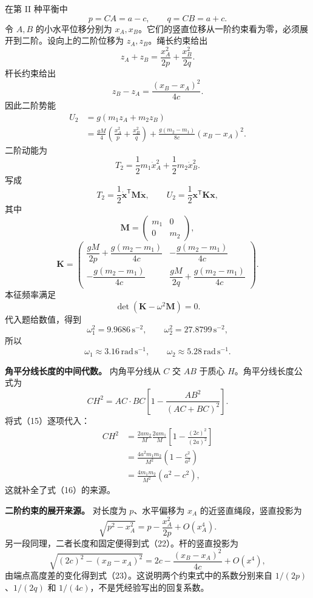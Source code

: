 \documentclass[12pt,a4paper,UTF8]{ctexart}
\begin{document}
在第 II 种平衡中 \[
p=CA=a-c,
\qquad
q=CB=a+c. \tag{21}
\] 令 \(A,B\) 的小水平位移分别为
\(x_A,x_B\)。它们的竖直位移从一阶约束看为零，必须展开到二阶。设向上的二阶位移为
\(z_A,z_B\)。绳长约束给出 \[
z_A+z_B=\frac{x_A^2}{2p}+\frac{x_B^2}{2q}. \tag{22}
\] 杆长约束给出 \[
z_B-z_A=\frac{(x_B-x_A)^2}{4c}. \tag{23}
\] 因此二阶势能 \[
\begin{aligned}
U_2
&=g(m_1z_A+m_2z_B)\\
&=\frac{gM}{4}
\left(\frac{x_A^2}{p}+\frac{x_B^2}{q}\right)
+\frac{g(m_2-m_1)}{8c}(x_B-x_A)^2.
\end{aligned} \tag{24}
\] 二阶动能为 \[
T_2=\frac12m_1\dot x_A^2+\frac12m_2\dot x_B^2. \tag{25}
\] 写成 \[
T_2=\frac12\dot{\boldsymbol x}^{\mathsf T}
\mathbf M\dot{\boldsymbol x},
\qquad
U_2=\frac12\boldsymbol x^{\mathsf T}
\mathbf K\boldsymbol x, \tag{26}
\] 其中 \[
\mathbf M=
\begin{pmatrix}m_1&0\\0&m_2\end{pmatrix}, \tag{27}
\] \[
\mathbf K=
\begin{pmatrix}
\dfrac{gM}{2p}+\dfrac{g(m_2-m_1)}{4c}
&-\dfrac{g(m_2-m_1)}{4c}\\[7pt]
-\dfrac{g(m_2-m_1)}{4c}
&\dfrac{gM}{2q}+\dfrac{g(m_2-m_1)}{4c}
\end{pmatrix}. \tag{28}
\] 本征频率满足 \[
\det(\mathbf K-\omega^2\mathbf M)=0. \tag{29}
\] 代入题给数值，得到 \[
\omega_1^2=9.9686\,\mathrm{s^{-2}},
\qquad
\omega_2^2=27.8799\,\mathrm{s^{-2}}, \tag{30}
\] 所以 \[
\boxed{\omega_1\approx3.16\,\mathrm{rad\,s^{-1}}},
\qquad
\boxed{\omega_2\approx5.28\,\mathrm{rad\,s^{-1}}}. \tag{31}
\]

\textbf{角平分线长度的中间代数。} 内角平分线从 \(C\) 交 \(AB\) 于质心
\(H\)。角平分线长度公式为 \[
CH^2=AC\cdot BC
\left[1-\frac{AB^2}{(AC+BC)^2}\right]. \tag{32}
\] 将式（15）逐项代入： \[
\begin{aligned}
CH^2
&=\frac{2am_2}{M}\frac{2am_1}{M}
\left[1-\frac{(2c)^2}{(2a)^2}\right]\\
&=\frac{4a^2m_1m_2}{M^2}
\left(1-\frac{c^2}{a^2}\right)\\
&=\frac{4m_1m_2}{M^2}(a^2-c^2),
\end{aligned} \tag{33}
\] 这就补全了式（16）的来源。

\textbf{二阶约束的展开来源。} 对长度为 \(p\)、水平偏移为 \(x_A\)
的近竖直绳段，竖直投影为 \[
\sqrt{p^2-x_A^2}
=p-\frac{x_A^2}{2p}+O(x_A^4). \tag{34}
\] 另一段同理，二者长度和固定便得到式（22）。杆的竖直投影为 \[
\sqrt{(2c)^2-(x_B-x_A)^2}
=2c-\frac{(x_B-x_A)^2}{4c}+O(x^4), \tag{35}
\] 由端点高度差的变化得到式（23）。这说明两个约束式中的系数分别来自
\(1/(2p)\)、\(1/(2q)\) 和 \(1/(4c)\)，不是凭经验写出的回复系数。
\end{document}
